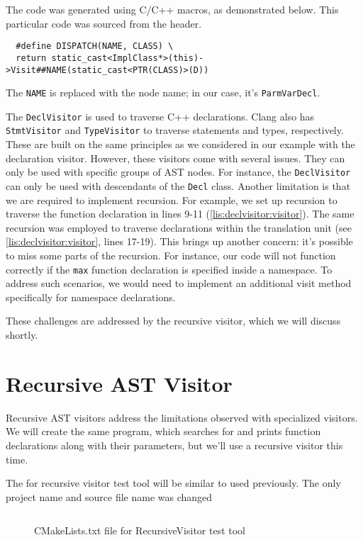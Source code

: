 The code was generated using C/C++ macros, as demonstrated below. This
particular code was sourced from the  header.
\begin{verbatim}
  #define DISPATCH(NAME, CLASS) \
  return static_cast<ImplClass*>(this)->Visit##NAME(static_cast<PTR(CLASS)>(D))
\end{verbatim}
The \texttt{NAME} is replaced with the node name; in our case, it's
\texttt{ParmVarDecl}. 

The \texttt{DeclVisitor} is used to traverse C++ declarations. Clang
also has \texttt{StmtVisitor} and \texttt{TypeVisitor} to
traverse statements and types, respectively. These are built on the same
principles as we  considered in our example with the declaration
visitor. However, these visitors come with several 
issues. They can only be used with specific groups of AST nodes. For instance,
the \texttt{DeclVisitor} can only be used with descendants of the
\texttt{Decl} class. 
Another limitation is that we are required to implement recursion. For example,
we set up recursion to traverse the function declaration in lines 
9-11 (\cref{lis:declvisitor:visitor}). The same recursion was employed to
traverse declarations within the translation unit (see
\cref{lis:declvisitor:visitor}, lines 17-19). This brings up another concern:
it's possible to miss some parts of the recursion. For instance, our code will
not function correctly if the \texttt{max} function declaration is
specified inside a namespace. 
To address such scenarios, we would need to implement an additional visit method
specifically for namespace declarations.

These challenges are addressed by the recursive visitor, which we will discuss
shortly. 

\section{Recursive AST Visitor}
Recursive AST visitors address the limitations observed with specialized
visitors. We will create the same program, which searches for and prints
function declarations along with their parameters, but we'll use a recursive
visitor this time. 

The  for recursive visitor test tool will be similar to
used previously. The only project name and source file name was changed
\begin{figure}[H]
\inputminted[highlightlines={2,14-17}]{cmake}{src/part1/ch3_ast/recursivevisitor/CMakeLists.txt}
\caption{CMakeLists.txt file for RecursiveVisitor test tool}
\label{lis:cmake:recursivevisitor}
\end{figure}


